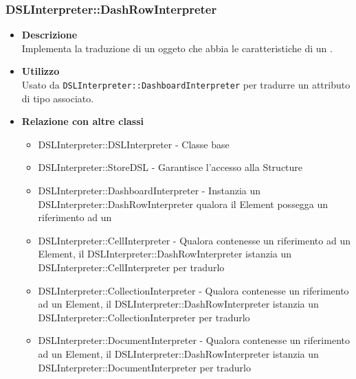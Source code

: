 \subsubsection{DSLInterpreter::DashRowInterpreter}
\begin{itemize}
\item \textbf{Descrizione} \hfill \\
Implementa la traduzione di un oggeto che abbia le caratteristiche di un .
\item \textbf{Utilizzo} \hfill \\
Usato da \texttt{DSLInterpreter::DashboardInterpreter} per tradurre un attributo di tipo  associato.
\item \textbf{Relazione con altre classi}
\begin{itemize}
\item DSLInterpreter::DSLInterpreter - Classe base
\item DSLInterpreter::StoreDSL - Garantisce l'accesso alla  Structure
\item DSLInterpreter::DashboardInterpreter - Instanzia un DSLInterpreter::DashRowInterpreter qualora il  Element possegga un riferimento ad un 
\item DSLInterpreter::CellInterpreter - Qualora  contenesse un riferimento ad un  Element, il DSLInterpreter::DashRowInterpreter istanzia un DSLInterpreter::CellInterpreter per tradurlo
\item DSLInterpreter::CollectionInterpreter - Qualora  contenesse un riferimento ad un  Element, il DSLInterpreter::DashRowInterpreter istanzia un DSLInterpreter::CollectionInterpreter per tradurlo
\item DSLInterpreter::DocumentInterpreter - Qualora  contenesse un riferimento ad un  Element, il DSLInterpreter::DashRowInterpreter istanzia un DSLInterpreter::DocumentInterpreter per tradurlo
\end{itemize}
\end{itemize}

